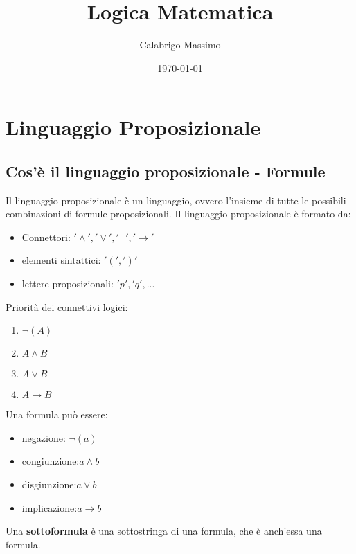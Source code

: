 \documentclass[11pt]{article}
\begin{document}
\title{Logica Matematica}
\author{Calabrigo Massimo}
\date{\today}
\maketitle

\tableofcontents

\section{Linguaggio Proposizionale}
\subsection{Cos'è il linguaggio proposizionale - Formule}
Il linguaggio proposizionale è un linguaggio, ovvero l'insieme di tutte le possibili combinazioni di formule proposizionali. Il linguaggio proposizionale è formato da:\\
\begin{itemize}
    \item Connettori: $'\land' , '\lor', '\neg', '\rightarrow'$
    \item elementi sintattici: $'(',')'$
    \item lettere proposizionali: $'p', 'q', ...$
\end{itemize}
Priorità dei connettivi logici:\\
\begin{enumerate}
    \item $\neg(A)$
    \item $A \land B$
    \item $A \lor B$
    \item $A \rightarrow B$
\end{enumerate}
Una formula può essere:\\
\begin{itemize}
    \item negazione: $\neg(a)$
    \item congiunzione:$a \land b$
    \item disgiunzione:$a \lor b$
    \item implicazione:$a \rightarrow b$
\end{itemize}
Una \textbf{sottoformula} è una sottostringa di una formula, che è anch'essa una formula.\\
\end{document}
